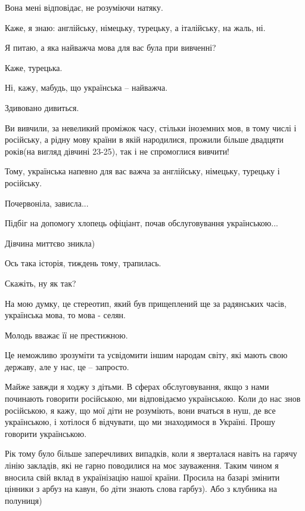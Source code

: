 \begin{itemize}
Вона мені відповідає, не розуміючи натяку.

Каже, я знаю: англійську, німецьку, турецьку, а італійську, на жаль, ні.

Я питаю, а яка найважча мова для вас була при вивченні?

Каже, турецька.

Ні, кажу, мабудь, що українська – найважча.

Здивовано дивиться.

Ви вивчили, за невеликий проміжок часу, стільки іноземних мов, в тому числі і
російську, а рідну мову країни в якій народилися, прожили більше двадцяти
років(на вигляд дівчині 23-25), так і не спромоглися вивчити!

Тому, українська напевно для вас важча за англійську, німецьку, турецьку і
російську.

Почервоніла, зависла...

Підбіг на допомогу хлопець офіціант, почав обслуговування українською...

Дівчина миттєво зникла)

Ось така історія, тиждень тому, трапилась.

Скажіть, ну як так?

На мою думку, це стереотип, який був прищеплений ще за радянських часів, українська мова, то мова - селян.

Молодь вважає її не престижною.

Це неможливо зрозуміти та усвідомити іншим народам світу, які мають свою державу, але у нас, це – запросто.

 

Майже завжди я ходжу з дітьми. В сферах обслуговування, якщо з нами починають
говорити російською, ми відповідаємо українською. Коли до нас знов російською,
я кажу, що мої діти не розуміють, вони вчаться в нуш, де все українською, і
хотілося б відчувати, що ми знаходимося в Україні. Прошу говорити українською.

Рік тому було більше заперечливих випадків, коли я зверталася навіть на гарячу
лінію закладів, які не гарно поводилися на моє зауваження. Таким чином я
вносила свій вклад в українізацію нашої країни. Просила на базарі змінити
цінники з арбуз на кавун, бо діти знають слова гарбуз). Або з клубника на
полуниця) 


\end{itemize}
